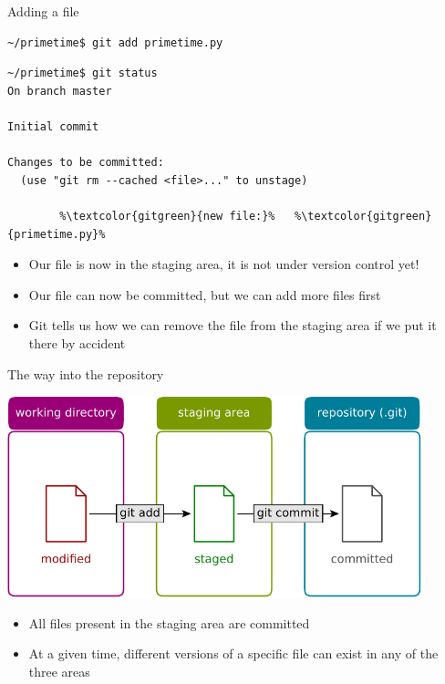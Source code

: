 \documentclass[svgnames]{beamer}
\begin{document}
\begin{frame}[fragile]{Adding a file}
 \begin{lstlisting}
~/primetime$ git add primetime.py
 \end{lstlisting}

 \vspace{0.2truecm}
 \begin{lstlisting}[escapechar=\%]
~/primetime$ git status
On branch master

Initial commit

Changes to be committed:
  (use "git rm --cached <file>..." to unstage)

        %\textcolor{gitgreen}{new file:}%   %\textcolor{gitgreen}{primetime.py}%
 \end{lstlisting}
 \begin{itemize}
  \item Our file is now in the staging area, \alert{it is not under version control yet!}
  \item Our file can now be committed, but we can add more files first
  \item Git tells us how we can remove the file from the staging area if we put
        it there by accident
 \end{itemize}
\end{frame}

\begin{frame}{The way into the repository}
 \begin{center}
  \includegraphics[width=0.9\textwidth]{addcommit}
 \end{center}
 \begin{itemize}
  \item All files present in the staging area are committed
  \item At a given time, different versions of a specific file can exist in
	any of the three areas
 \end{itemize}
\end{frame}
\end{document}

